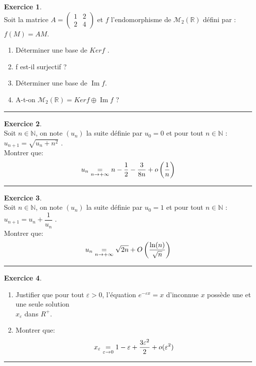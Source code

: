 \documentclass[a4paper,10pt]{article}
\theoremstyle{definition}
\theoremstyle{definition}
\newtheorem{exo}{Exercice}
\newcommand{\R}{\mathbb{R}}
\newcommand{\N}{\mathbb{N}}
\newcommand{\M}{\mathcal{M}}
\renewcommand{\Im}{\mathop{\mathrm{Im}}\nolimits}
\begin{document}
\begin{exo}\textbf{}\quad\\[0.25cm]
Soit la matrice $A = \begin{pmatrix}
1 & 2\\2&4\end{pmatrix}$ et $f$ l’endomorphisme de $\M_2(\R)$ défini par : $f (M) = AM$.
 
	\begin{enumerate}
		\item Déterminer une base de $Kerf$ .
		\item f est-il surjectif ?
		\item Déterminer une base de $\Im f$.
		\item A-t-on $\M_2 (\R) = Kerf \oplus \Im f$ ? 
	\end{enumerate}
	
	\centering
	\rule{1\linewidth}{0.6pt}
\end{exo}


\begin{exo}\quad\\[0.25cm]
Soit $n\in\N $, on note $(u_n)$  la suite définie par
$u_0 = 0$ et pour tout $n  \in\N$ : $u_{n+1}= \sqrt{u_n + n^2}$ .\\
Montrer que: $$ \large u_n \underset{n\rightarrow+\infty}{=} n -\dfrac{1}{2} -\dfrac{3}{8n} + o\left(\dfrac{1}{n}\right)$$

\centering
\rule{1\linewidth}{0.6pt}
\end{exo}			


\begin{exo}\quad\\[0.25cm]
	Soit $n\in\N $, on note $(u_n)$  la suite définie par
	$u_0 = 1$ et pour tout $n  \in\N$ : $u_{n+1}= u_n + \dfrac{1}{u_n}$ .\\
	Montrer que: $$ \large u_n \underset{n\rightarrow+\infty}{=} \sqrt{2n} + O\left(\dfrac{\ln(n)}{\sqrt{n}}\right)$$
	
	
	\centering
	\rule{1\linewidth}{0.6pt}
\end{exo}

\begin{exo}\quad\\[0.25cm]
	\begin{enumerate}
		\item Justifier que pour tout $\varepsilon > 0$, l’équation $e^{-\varepsilon x}= x$ d’inconnue $x$ possède une et une seule solution \\$x_\varepsilon$ dans $R^+.$
		\item Montrer que: $$ \large x_\varepsilon \underset{\varepsilon\rightarrow0}{=} 1 - \varepsilon + \dfrac{3\varepsilon^2}{2} + o(\varepsilon^2) $$
	\end{enumerate}

\newpage	
	
	
	\centering
	\rule{1\linewidth}{0.6pt}
\end{exo}
\end{document}
